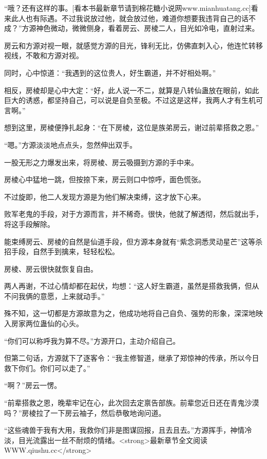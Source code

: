 
\begin{this_body}

“哦？还有这样的事。[看本书最新章节请到棉花糖小说网www.mianhuatang.cc]看来此人也有际遇。不过我说放过他，就会放过他，难道你想要我违背自己的话不成？”方源神色微动，微微侧身，看着房云、房棱二人，目光如冷电，直射过来。

房云和方源对视一眼，就感觉方源的目光，锋利无比，仿佛直刺入心，他连忙转移视线，不敢和方源对视。

同时，心中惊道：“我遇到的这位贵人，好生霸道，并不好相处啊。”

相反，房棱却是心中大定：“好，此人说一不二，就算是八转仙蛊放在眼前，如此巨大的诱惑，都坚持自己，可以说是自负至极。不过这是这样，我两人才有生机可言啊。”

想到这里，房棱便挣扎起身：“在下房棱，这位是族弟房云，谢过前辈搭救之恩。”

“嗯。”方源淡淡地点点头，忽然伸出双手。

一股无形之力爆发出来，将房棱、房云吸摄到方源的手中来。

房棱心中猛地一跳，但按捺下来，房云则口中惊呼，面色慌张。

不过旋即，他二人发现方源是为他们解决束缚，这才放下心来。

败军老鬼的手段，对于方源而言，并不稀奇。很快，他就了解透彻，然后就出手，将这手段解除。

能束缚房云、房棱的自然是仙道手段，但方源本身就有“紫念洞悉灵动星芒”这等杀招手段，自然手到擒来，轻轻松松。

房棱、房云很快就恢复自由。

两人再谢，不过心情却都在起伏，均想：“这人好生霸道，虽然是搭救我俩，但从不问我俩的意愿，上来就动手。”

殊不知，这一切都是方源故意为之，他成功地将自己自负、强势的形象，深深地映入房家两位蛊仙的心头。

“你们可以称呼我为算不尽。”方源开口，主动介绍自己。

但第二句话，方源就下了逐客令：“我主修智道，继承了郑惊神的传承，所以今日救下你们。你们可以走了。”

“啊？”房云一愣。

“前辈搭救之恩，晚辈牢记在心，此次回去定禀告部族。前辈您近日还在青鬼沙漠吗？”房棱拉了一下房云袖子，然后恭敬地询问道。

“这些魂兽于我有大用，我救你们非是图谋回报，且去且去。”方源挥手，神情冷淡，目光流露出一丝不耐烦的情绪。<strong>最新章节全文阅读WWW.qiushu.cc</strong>


\end{this_body}
